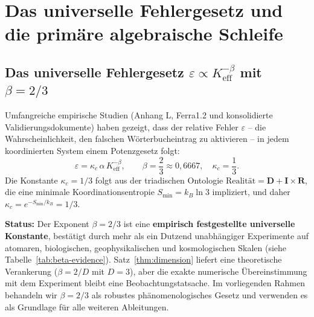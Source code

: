 \documentclass[12pt,a4paper]{article}
\begin{document}
	\section{Das universelle Fehlergesetz und die primäre algebraische Schleife}
	\label{sec:error-law}
	
	\subsection{Das universelle Fehlergesetz \(\varepsilon \propto K_{\mathrm{eff}}^{-\beta}\) mit \(\beta = 2/3\)}
	
	Umfangreiche empirische Studien (Anhang L, Ferra1.2 und konsolidierte Validierungsdokumente) haben gezeigt, dass der relative Fehler \(\varepsilon\) – die Wahrscheinlichkeit, den falschen Wörterbucheintrag zu aktivieren – in jedem koordinierten System einem Potenzgesetz folgt:
	\begin{equation}
		\boxed{\varepsilon = \kappa_c \, \alpha \, K_{\mathrm{eff}}^{-\beta}, \qquad \beta = \frac{2}{3} \approx 0,6667,\quad \kappa_c = \frac{1}{3}}.
		\label{eq:error-law}
	\end{equation}
	Die Konstante \(\kappa_c = 1/3\) folgt aus der triadischen Ontologie \(\text{Realität} = \mathbf{D} + \mathbf{I} \times \mathbf{R}\), die eine minimale Koordinationsentropie \(S_{\min} = k_B \ln 3\) impliziert, und daher \(\kappa_c = e^{-S_{\min}/k_B} = 1/3\).
	
	\textbf{Status:} Der Exponent \(\beta = 2/3\) ist eine \textbf{empirisch festgestellte universelle Konstante}, bestätigt durch mehr als ein Dutzend unabhängiger Experimente auf atomaren, biologischen, geophysikalischen und kosmologischen Skalen (siehe Tabelle~\ref{tab:beta-evidence}). Satz~\ref{thm:dimension} liefert eine theoretische Verankerung (\(\beta = 2/D\) mit \(D=3\)), aber die exakte numerische Übereinstimmung mit dem Experiment bleibt eine Beobachtungstatsache. Im vorliegenden Rahmen behandeln wir \(\beta = 2/3\) als robustes phänomenologisches Gesetz und verwenden es als Grundlage für alle weiteren Ableitungen.
	
\end{document}
